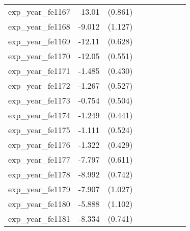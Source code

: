 {\begin{tabular}{l*{4}{cc}}
exp\_year\_fe1167&   -13.01\sym{***}&  (0.861)&                  &         &                  &         &                  &         \\
exp\_year\_fe1168&   -9.012\sym{***}&  (1.127)&                  &         &                  &         &                  &         \\
exp\_year\_fe1169&   -12.11\sym{***}&  (0.628)&                  &         &                  &         &                  &         \\
exp\_year\_fe1170&   -12.05\sym{***}&  (0.551)&                  &         &                  &         &                  &         \\
exp\_year\_fe1171&   -1.485\sym{***}&  (0.430)&                  &         &                  &         &                  &         \\
exp\_year\_fe1172&   -1.267\sym{*}  &  (0.527)&                  &         &                  &         &                  &         \\
exp\_year\_fe1173&   -0.754         &  (0.504)&                  &         &                  &         &                  &         \\
exp\_year\_fe1174&   -1.249\sym{**} &  (0.441)&                  &         &                  &         &                  &         \\
exp\_year\_fe1175&   -1.111\sym{*}  &  (0.524)&                  &         &                  &         &                  &         \\
exp\_year\_fe1176&   -1.322\sym{**} &  (0.429)&                  &         &                  &         &                  &         \\
exp\_year\_fe1177&   -7.797\sym{***}&  (0.611)&                  &         &                  &         &                  &         \\
exp\_year\_fe1178&   -8.992\sym{***}&  (0.742)&                  &         &                  &         &                  &         \\
exp\_year\_fe1179&   -7.907\sym{***}&  (1.027)&                  &         &                  &         &                  &         \\
exp\_year\_fe1180&   -5.888\sym{***}&  (1.102)&                  &         &                  &         &                  &         \\
exp\_year\_fe1181&   -8.334\sym{***}&  (0.741)&                  &         &                  &         &                  &         \\

\end{tabular}}
